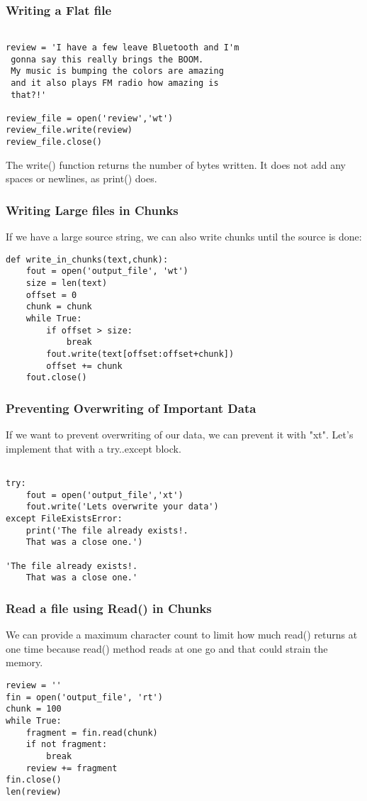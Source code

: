 \documentclass{beamer}
\begin{document}
\begin{frame}[fragile]
\frametitle{Writing a Flat file}
\begin{lstlisting}

review = 'I have a few leave Bluetooth and I'm
 gonna say this really brings the BOOM.
 My music is bumping the colors are amazing
 and it also plays FM radio how amazing is
 that?!'

review_file = open('review','wt')
review_file.write(review)
review_file.close()
\end{lstlisting}

The write() function returns the number of bytes written. It does not add any spaces
or newlines, as print() does.
\end{frame}


\begin{frame}[fragile]
\frametitle{Writing Large files in Chunks}
If we have a large source string, we can also write chunks until the source is done:

\begin{lstlisting}
def write_in_chunks(text,chunk):
    fout = open('output_file', 'wt')
    size = len(text)
    offset = 0
    chunk = chunk
    while True:
        if offset > size:
            break
        fout.write(text[offset:offset+chunk])
        offset += chunk
    fout.close()
\end{lstlisting}
\end{frame}


\begin{frame}[fragile]
\frametitle{Preventing Overwriting of Important Data}
If we want to prevent overwriting of our data, we can prevent it with "xt". Let's implement that with a try..except block.
\begin{lstlisting}

try:
	fout = open('output_file','xt')
	fout.write('Lets overwrite your data')
except FileExistsError:
	print('The file already exists!. 
	That was a close one.')
	
'The file already exists!. 
	That was a close one.'
\end{lstlisting}
\end{frame}


\begin{frame}[fragile]
\frametitle{Read a file using Read() in Chunks}
We can provide a maximum character count to limit how much read() returns at one
time because read() method reads at one go and that could strain the memory.

\begin{lstlisting}
review = ''
fin = open('output_file', 'rt')
chunk = 100
while True:
    fragment = fin.read(chunk)
    if not fragment:
        break
    review += fragment
fin.close()
len(review)
\end{lstlisting}
\end{frame}
\end{document}
